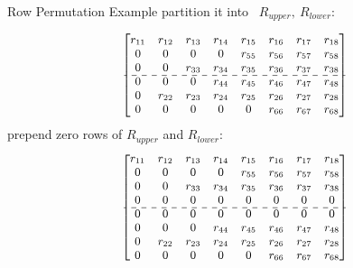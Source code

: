 \documentclass{beamer}
\begin{document}
\begin{frame}{Row Permutation Example}
partition it into \ $R_{upper}, \ R_{lower}$:
    
     \begin{align*}
 \small
 \begin{bmatrix}
 r_{11} & r_{12} & r_{13} & r_{14} & r_{15} & r_{16} & r_{17} & r_{18}\\
 0      & 0      & 0      & 0      & r_{55} & r_{56} & r_{57} & r_{58}\\
 0      & 0      & r_{33} & r_{34} & r_{35} & r_{36} & r_{37} & r_{38}\\
 \cdashline{1-8}
 0      & 0      & 0      & r_{44} & r_{45} & r_{46} & r_{47} & r_{48}\\
 0      & r_{22}  & r_{23} & r_{24} & r_{25} & r_{26} & r_{27} & r_{28}\\
 0      & 0      & 0      & 0      & 0      & r_{66} & r_{67} & r_{68}\\
\end{bmatrix}
\end{align*}
prepend zero rows of \( R_{upper} \) and \( R_{lower} \):
\begin{align*}
\small
\begin{bmatrix}
 r_{11} & r_{12} & r_{13} & r_{14} & r_{15} & r_{16} & r_{17} & r_{18}\\
 0      & 0      & 0      & 0      & r_{55} & r_{56} & r_{57} & r_{58}\\
 0      & 0      & r_{33} & r_{34} & r_{35} & r_{36} & r_{37} & r_{38}\\
 0      & 0      & 0      & 0      & 0      & 0      & 0      & 0     \\
 \cdashline{1-8}
 0      & 0      & 0      & 0      & 0      & 0      & 0      & 0     \\
 0      & 0      & 0      & r_{44} & r_{45} & r_{46} & r_{47} & r_{48}\\
 0      & r_{22} & r_{23} & r_{24} & r_{25} & r_{26} & r_{27} & r_{28}\\
 0      & 0      & 0      & 0      & 0      & r_{66} & r_{67} & r_{68}\\
\end{bmatrix} 
\end{align*}
\end{frame}
\end{document}
